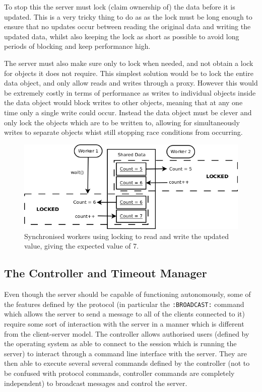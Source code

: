 To stop this the server must lock (claim ownership of) the data before it is updated. This is a very tricky thing to do as as the lock must be long enough to ensure that no updates occur between reading the original data and writing the updated data, whilst also keeping the lock as short as possible to avoid long periods of blocking and keep performance high.


The server must also make sure only to lock when needed, and not obtain a lock for objects it does not require. This simplest solution would be to lock the entire data object, and only allow reads and writes through a proxy. However this would be extremely costly in terms of performance as writes to individual objects inside the data object would block writes to other objects, meaning that at any one time only a single write could occur. Instead the data object must be clever and only lock the objects which are to be written to, allowing for simultaneously writes to separate objects whist still stopping race conditions from occurring.

\begin{figure}
    \begin{center}
        \includegraphics[scale=0.6]{Design/diagrams/server_locking.png}
        \caption{Synchronised workers using locking to read and write the updated value, giving the expected value of 7.}
        \label{lockingDia}
    \end{center}
\end{figure}

\subsection{The Controller and Timeout Manager}
Even though the server should be capable of functioning autonomously, some of the features defined by the protocol (in particular the \texttt{:BROADCAST:} command which allows the server to send a message to all of the clients connected to it) require some sort of interaction with the server in a manner which is different from the client-server model. The controller allows authorised users (defined by the operating system as able to connect to the session which is running the server) to interact through a command line interface with the server. They are then able to execute several several commands defined by the controller (not to be confused with protocol commands, controller commands are completely independent) to broadcast messages and control the server. 

